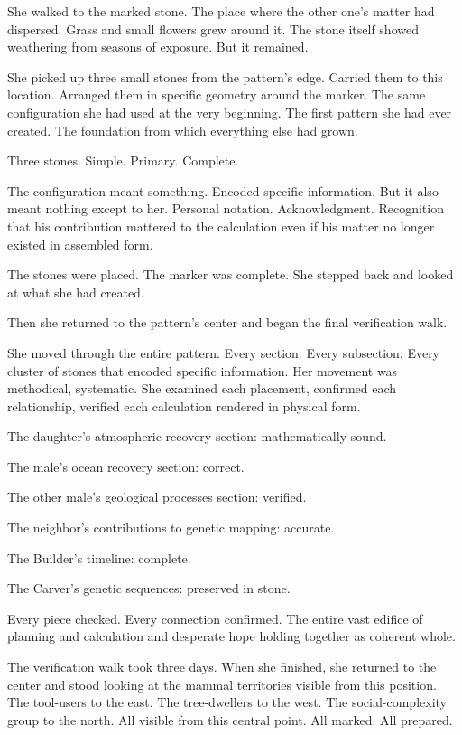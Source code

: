 She walked to the marked stone. The place where the other one's matter had dispersed. Grass and small flowers grew around it. The stone itself showed weathering from seasons of exposure. But it remained.

She picked up three small stones from the pattern's edge. Carried them to this location. Arranged them in specific geometry around the marker. The same configuration she had used at the very beginning. The first pattern she had ever created. The foundation from which everything else had grown.

Three stones. Simple. Primary. Complete.

The configuration meant something. Encoded specific information. But it also meant nothing except to her. Personal notation. Acknowledgment. Recognition that his contribution mattered to the calculation even if his matter no longer existed in assembled form.

The stones were placed. The marker was complete. She stepped back and looked at what she had created.

Then she returned to the pattern's center and began the final verification walk.

\scenebreak

She moved through the entire pattern. Every section. Every subsection. Every cluster of stones that encoded specific information. Her movement was methodical, systematic. She examined each placement, confirmed each relationship, verified each calculation rendered in physical form.

The daughter's atmospheric recovery section: mathematically sound.

The male's ocean recovery section: correct.

The other male's geological processes section: verified.

The neighbor's contributions to genetic mapping: accurate.

The Builder's timeline: complete.

The Carver's genetic sequences: preserved in stone.

Every piece checked. Every connection confirmed. The entire vast edifice of planning and calculation and desperate hope holding together as coherent whole.

The verification walk took three days. When she finished, she returned to the center and stood looking at the mammal territories visible from this position. The tool-users to the east. The tree-dwellers to the west. The social-complexity group to the north. All visible from this central point. All marked. All prepared.

